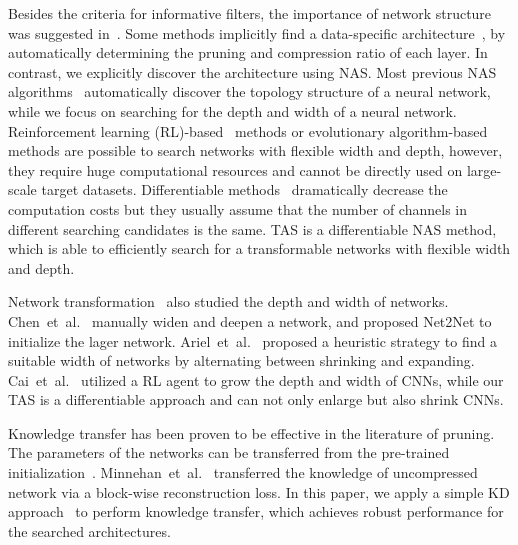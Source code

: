\documentclass{article}
\def\NAME{{TAS}}
\begin{document}
Besides the criteria for informative filters, the importance of network structure was suggested in~\cite{liu2019rethinking}.
Some methods implicitly find a data-specific architecture~\cite{wen2016learning,alvarez2016learning,he2018amc}, by automatically determining the pruning and compression ratio of each layer.
In contrast, we explicitly discover the architecture using NAS.
Most previous NAS algorithms~\cite{zoph2017neural,dong2019search,liu2019darts,real2019regularized} automatically discover the topology structure of a neural network, while we focus on searching for the depth and width of a neural network.
Reinforcement learning (RL)-based~\cite{zoph2017neural,cai2018efficient} methods or evolutionary algorithm-based~\cite{real2019regularized} methods are possible to search networks with flexible width and depth, however, they require huge computational resources and cannot be directly used on large-scale target datasets.
Differentiable methods~\cite{dong2019search,liu2019darts,cai2018proxylessnas} dramatically decrease the computation costs but they usually assume that the number of channels in different searching candidates is the same.
{\NAME} is a differentiable NAS method, which is able to efficiently search for a transformable networks with flexible width and depth.


Network transformation~\cite{chen2016net2net,gordon2018morphnet,cai2018efficient} also studied the depth and width of networks. Chen~et~al.~\cite{chen2016net2net} manually widen and deepen a network, and proposed Net2Net to initialize the lager network.
Ariel~et~al.~\cite{gordon2018morphnet} proposed a heuristic strategy to find a suitable width of networks by alternating between shrinking and expanding.
Cai~et~al.~\cite{cai2018efficient} utilized a RL agent to grow the depth and width of CNNs, while our {\NAME} is a differentiable approach and can not only enlarge but also shrink CNNs.



Knowledge transfer has been proven to be effective in the literature of pruning.
The parameters of the networks can be transferred from the pre-trained initialization~\cite{li2017pruning,he2018soft}.
Minnehan~et~al.~\cite{minnehan2019cascaded} transferred the knowledge of uncompressed network via a block-wise reconstruction loss.
In this paper, we apply a simple KD approach~\cite{hinton2014distilling} to perform knowledge transfer, which achieves robust performance for the searched architectures.
\end{document}
